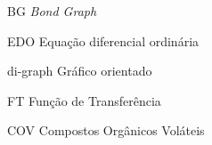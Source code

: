 \begin{siglas}
  \item[BG] \textit{Bond Graph}
  \item[EDO] Equação diferencial ordinária 
  \item[di-graph] Gráfico orientado
  \item [FT] Função de Transferência
  \item [COV] Compostos Orgânicos Voláteis 
\end{siglas}
